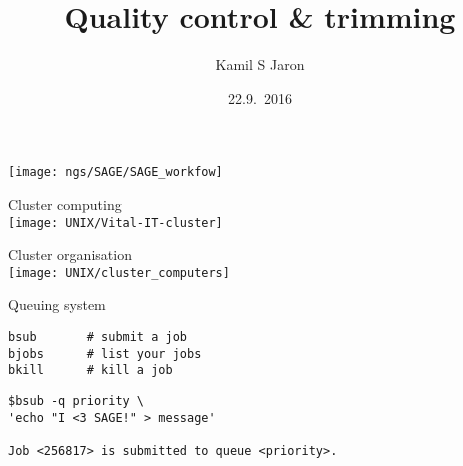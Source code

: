 \documentclass[xcolor=dvipsnames]{beamer}
\title[ ]{Quality control \& trimming}
\author{Kamil S Jaron}
\date{22.9.~2016}
\begin{document}
\LARGE

\begin{frame}
	\titlepage
\end{frame}

\begin{frame}
	\begin{center}
		\texttt{[image: ngs/SAGE/SAGE\_workfow]}
	\end{center}
\end{frame}

\begin{frame}
	\begin{center}
		\Huge
		Cluster computing\\
		\vspace{1cm}
		\texttt{[image: UNIX/Vital-IT-cluster]}
	\end{center}
\end{frame}

\begin{frame}
	\begin{center}
		\Huge
		Cluster organisation\\
		\vspace{1cm}
		\texttt{[image: UNIX/cluster\_computers]}
	\end{center}
\end{frame}

\begin{frame}
	\begin{center}
		\Huge
		Queuing system\\
		\vspace{1cm}

	\end{center}
\end{frame}

\begin{frame}[fragile]
\huge
\begin{verbatim}
bsub       # submit a job
bjobs      # list your jobs
bkill      # kill a job
\end{verbatim}
\end{frame}

\begin{frame}[fragile]
\large
\begin{verbatim}
$bsub -q priority \
'echo "I <3 SAGE!" > message'

Job <256817> is submitted to queue <priority>.
\end{verbatim}
\end{frame}
\end{document}
